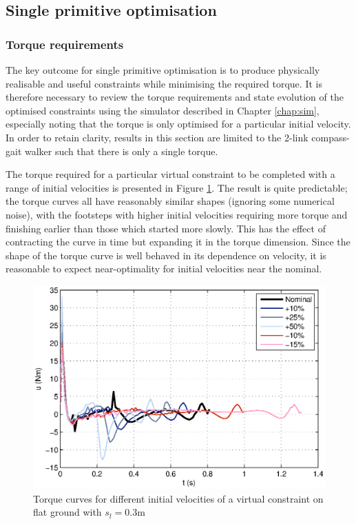 \subsection{Single primitive optimisation}
\subsubsection{Torque requirements}
The key outcome for single primitive optimisation is to produce physically realisable and useful constraints while minimising the required torque. It is therefore necessary to review the torque requirements and state evolution of the optimised constraints using the simulator described in Chapter \ref{chap:sim}, especially noting that the torque is only optimised for a particular initial velocity. In order to retain clarity, results in this section are limited to the 2-link compass-gait walker such that there is only a single torque.

The torque required for a particular virtual constraint to be completed with a range of initial velocities is presented in Figure \ref{fig:singleflattorque}. The result is quite predictable; the torque curves all have reasonably similar shapes (ignoring some numerical noise), with the footsteps with higher initial velocities requiring more torque and finishing earlier than those which started more slowly. This has the effect of contracting the curve in time but expanding it in the torque dimension. Since the shape of the torque curve is well behaved in its dependence on velocity, it is reasonable to expect near-optimality for initial velocities near the nominal.

\begin{figure}
\centering
\includegraphics[width=0.8\linewidth]{7Results/singleflattorque}
\caption[Torque curves for differing initial velocities on flat ground]{Torque curves for different initial velocities of a virtual constraint on flat ground with $s_l=0.3$m}
\label{fig:singleflattorque}
\end{figure}

